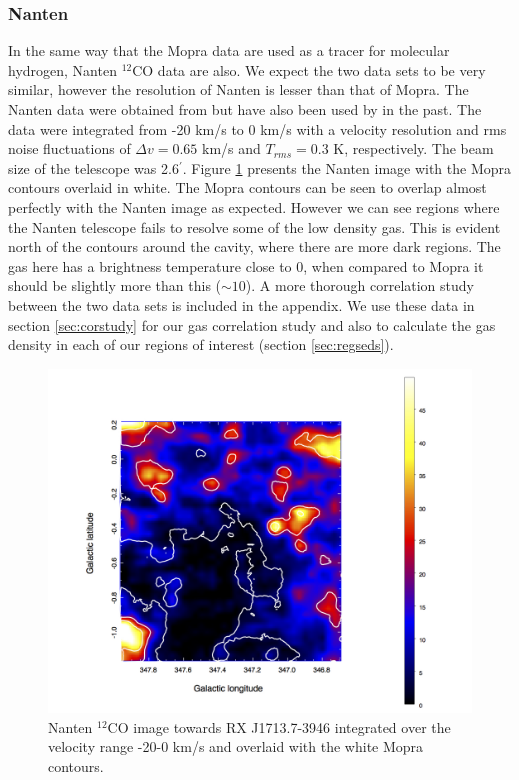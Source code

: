 \documentclass[12pt,a4paper]{article}
\begin{document}
\subsubsection{Nanten}
In the same way that the Mopra data are used as a tracer for molecular hydrogen, Nanten $^{12}$CO data are also. We expect the two data sets to be very similar, however the resolution of Nanten is lesser than that of Mopra. The Nanten data were obtained from \cite{2012ApJ...746...82F} but have also been used by \cite{2005ApJ...631..947M} in the past. The data were integrated from -20 km/s to 0 km/s with a velocity resolution and rms noise fluctuations of $\Delta v = 0.65$ km/s and $T_{rms} = 0.3$ K, respectively. The beam size of the telescope was 2.6$^\prime$. Figure \ref{fig:nantenmap} presents the Nanten image with the Mopra contours overlaid in white. The Mopra contours can be seen to overlap almost perfectly with the Nanten image as expected. However we can see regions where the Nanten telescope fails to resolve some of the low density gas. This is evident north of the contours around the cavity, where there are more dark regions. The gas here has a brightness temperature close to 0, when compared to Mopra it should be slightly more than this ($\sim 10$). A more thorough correlation study between the two data sets is included in the appendix. We use these data in section \ref{sec:corstudy} for our gas correlation study and also to calculate the gas density in each of our regions of interest (section \ref{sec:regseds}).
\begin{figure}[H]
	\centering
	\includegraphics[width=0.73\linewidth, height=0.35\textheight]{nanten_map}
	\caption{Nanten $^{12}$CO image towards RX J1713.7-3946 integrated over the velocity range -20-0 km/s and overlaid with the white Mopra contours.}
	\label{fig:nantenmap}
\end{figure}
\end{document}
